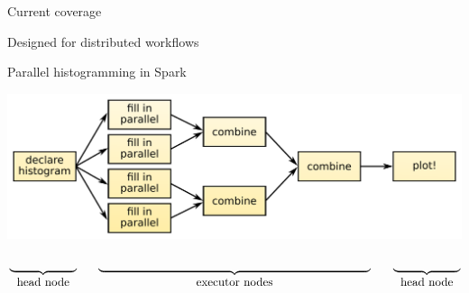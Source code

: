\documentclass[aspectratio=169]{beamer}
\begin{document}
\begin{frame}{Current coverage}
\vspace{-2.5 cm}
\hfill {} \hspace{-1 cm}
\vspace{2.5 cm}
\end{frame}

\begin{frame}{Designed for distributed workflows}
\vspace{0.5 cm}
\begin{block}{Parallel histogramming in Spark}
\end{block}

\includegraphics[width=\linewidth]{parallelization.pdf}

\vspace{-1 cm}
\[ \underbrace{\mbox{\hspace{2 cm}}}_{\mbox{head node}} \hspace{0.6 cm} \underbrace{\mbox{\hspace{8.125 cm}}}_{\mbox{executor nodes}} \hspace{0.625 cm} \underbrace{\mbox{\hspace{2 cm}}}_{\mbox{head node}} \]

\end{frame}
\end{document}
